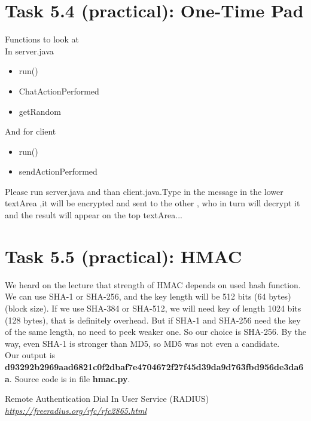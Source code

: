 \documentclass{article}
\begin{document}
\section *{Task 5.4 (practical): One-Time Pad}
Functions to look at\\
In server.java
\begin{itemize}
\item run() 
\item ChatActionPerformed 
\item getRandom 
\end{itemize}
And for client
\begin{itemize}
\item run()
\item sendActionPerformed
\end{itemize}

Please run server.java and than client.java.Type in the message in the lower textArea ,it will be encrypted and sent to the other , who in turn will decrypt it and the result will appear on the top textArea...

\section *{Task 5.5 (practical): HMAC}
We heard on the lecture that strength of HMAC depends on used hash function. We can use SHA-1 or SHA-256, and the key length will be 512 bits (64 bytes) (block size). If we use SHA-384 or SHA-512, we will need key of length 1024 bits (128 bytes), that is definitely overhead. But if SHA-1 and SHA-256 need the key of the same length, no need to peek weaker one. So our choice is SHA-256. By the way, even SHA-1 is stronger than MD5, so MD5 was not even a candidate.
\\
Our output is \\
\textbf{d93292b2969aad6821c0f2dbaf7e4704672f27f45d39da9d763fbd956de3da6a}. Source code is in file \textbf{hmac.py}.


\begin{thebibliography}{9}

  Remote Authentication Dial In User Service (RADIUS)
  \emph{\url{https://freeradius.org/rfc/rfc2865.html}}
    
\end{thebibliography}
\end{document}
